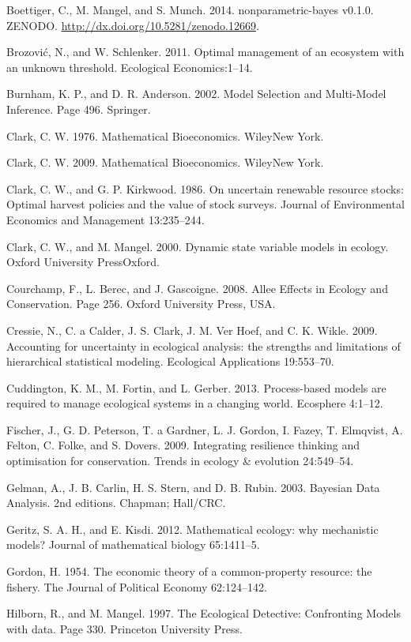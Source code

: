 \documentclass[author-year, 12pt,review]{components/elsarticle} %
\begin{document}
Boettiger, C., M. Mangel, and S. Munch. 2014. nonparametric-bayes
v0.1.0. ZENODO. \url{http://dx.doi.org/10.5281/zenodo.12669}.

Brozović, N., and W. Schlenker. 2011. Optimal management of an ecosystem
with an unknown threshold. Ecological Economics:1--14.

Burnham, K. P., and D. R. Anderson. 2002. Model Selection and
Multi-Model Inference. Page 496. Springer.

Clark, C. W. 1976. Mathematical Bioeconomics. WileyNew York.

Clark, C. W. 2009. Mathematical Bioeconomics. WileyNew York.

Clark, C. W., and G. P. Kirkwood. 1986. On uncertain renewable resource
stocks: Optimal harvest policies and the value of stock surveys. Journal
of Environmental Economics and Management 13:235--244.

Clark, C. W., and M. Mangel. 2000. Dynamic state variable models in
ecology. Oxford University PressOxford.

Courchamp, F., L. Berec, and J. Gascoigne. 2008. Allee Effects in
Ecology and Conservation. Page 256. Oxford University Press, USA.

Cressie, N., C. a Calder, J. S. Clark, J. M. {Ver Hoef}, and C. K.
Wikle. 2009. Accounting for uncertainty in ecological analysis: the
strengths and limitations of hierarchical statistical modeling.
Ecological Applications 19:553--70.

Cuddington, K. M., M. Fortin, and L. Gerber. 2013. Process-based models
are required to manage ecological systems in a changing world. Ecosphere
4:1--12.

Fischer, J., G. D. Peterson, T. a Gardner, L. J. Gordon, I. Fazey, T.
Elmqvist, A. Felton, C. Folke, and S. Dovers. 2009. Integrating
resilience thinking and optimisation for conservation. Trends in ecology
\& evolution 24:549--54.

Gelman, A., J. B. Carlin, H. S. Stern, and D. B. Rubin. 2003. Bayesian
Data Analysis. 2nd editions. Chapman; Hall/CRC.

Geritz, S. A. H., and E. Kisdi. 2012. Mathematical ecology: why
mechanistic models? Journal of mathematical biology 65:1411--5.

Gordon, H. 1954. The economic theory of a common-property resource: the
fishery. The Journal of Political Economy 62:124--142.

Hilborn, R., and M. Mangel. 1997. The Ecological Detective: Confronting
Models with data. Page 330. Princeton University Press.
\end{document}
